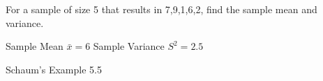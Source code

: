 \begin{samepage}
\begin{ex}
    For a sample of size 5 that results in 7,9,1,6,2, find the sample mean and variance.
\end{ex}
\begin{ans}
Sample Mean $\bar{x} = 6$
Sample Variance $S^2 = 2.5$
\end{ans}
\begin{source}
Schaum's Example 5.5
\end{source}
\end{samepage}

